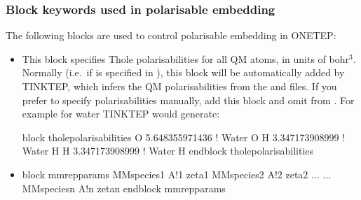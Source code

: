 \documentclass[letterpaper,10pt,english]{sphinxmanual}
\begin{document}
\subsubsection{Block keywords used in polarisable embedding}
\label{\detokenize{tinktep:block-keywords-used-in-polarisable-embedding}}
The following blocks are used to control polarisable embedding in
ONETEP:
\begin{itemize}
\item {} 
%
\begin{sphinxVerbatim}[commandchars=\\\{\}]
 
 
 
        
 
 
\end{sphinxVerbatim}

This block specifies Thole polarisabilities for all QM atoms, in
units of bohr\(^3\). Normally (i.e. if
 is specified in ), this
block will be automatically added by TINKTEP, which infers the QM
polarisabilities from the  and  files. If you prefer
to specify polarisabilities manually, add this block and omit
 from . For example for
water TINKTEP would generate:

%
\begin{sphinxVerbatim}[commandchars=\\\{\}]
\PYGZpc{}block thole\PYGZus{}polarisabilities
O 5.648355971436 ! Water O
H 3.347173908999 ! Water H
H 3.347173908999 ! Water H
\PYGZpc{}endblock thole\PYGZus{}polarisabilities
\end{sphinxVerbatim}

\item {} 
%
\begin{sphinxVerbatim}[commandchars=\\\{\}]
\PYGZpc{}block mm\PYGZus{}rep\PYGZus{}params
\PYGZlt{}MMspecies1\PYGZgt{} \PYGZlt{}A!1\PYGZgt{} \PYGZlt{}zeta1\PYGZgt{}
\PYGZlt{}MMspecies2\PYGZgt{} \PYGZlt{}A!2\PYGZgt{} \PYGZlt{}zeta2\PYGZgt{}
...        ...
\PYGZlt{}MMspecies\PYGZlt{}n\PYGZgt{}\PYGZgt{} \PYGZlt{}A!\PYGZlt{}n\PYGZgt{}\PYGZgt{} \PYGZlt{}zeta\PYGZlt{}n\PYGZgt{}\PYGZgt{}
\PYGZpc{}endblock mm\PYGZus{}rep\PYGZus{}params
\end{sphinxVerbatim}


\end{itemize}
\end{document}
